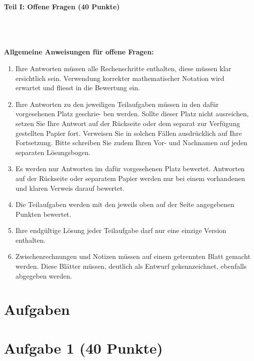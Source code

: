 

\begin{Large}
\textbf{Teil I: Offene Fragen (40 Punkte)}
\end{Large}
\\
\\
\\
\textbf{Allgemeine Anweisungen für offene Fragen:}
\\
\renewcommand{\labelenumi}{(\roman{enumi})}
\begin{enumerate}
\item
Ihre Antworten müssen alle Rechenschritte enthalten,
diese müssen klar ersichtlich sein.
Verwendung korrekter mathematischer Notation wird erwartet
und fliesst in die Bewertung ein.

\item
Ihre Antworten zu den jeweiligen Teilaufgaben müssen in den dafür vorgesehenen Platz geschrie-
ben werden. Sollte dieser Platz nicht ausreichen, setzen Sie Ihre Antwort auf der Rückseite oder
dem separat zur Verfügung gestellten Papier fort. Verweisen Sie in solchen Fällen ausdrücklich
auf Ihre Fortsetzung. Bitte schreiben Sie zudem Ihren Vor- und Nachnamen auf jeden separaten
Lösungsbogen.

\item
Es werden nur Antworten im dafür vorgesehenen Platz bewertet. Antworten auf der Rückseite
oder separatem Papier werden nur bei einem vorhandenen und klaren Verweis darauf bewertet.

\item
Die Teilaufgaben werden mit den jeweils oben auf der Seite angegebenen Punkten bewertet.

\item
Ihre endgültige Lösung jeder Teilaufgabe darf nur eine einzige Version enthalten.

\item
Zwischenrechnungen und Notizen müssen auf einem getrennten Blatt gemacht werden. Diese
Blätter müssen, deutlich als Entwurf gekennzeichnet, ebenfalls abgegeben werden.
\end{enumerate}

\newpage
\section*{\hfil Aufgaben \hfil}
\vspace{1cm}
\section*{Aufgabe 1 (40 Punkte)}
\vspace{0.4cm}
